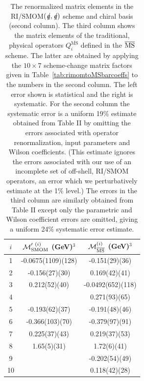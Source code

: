 \documentclass[aps,prl,
superscriptaddress,
showpacs,
preprintnumbers,
bibnotes,
amsmath,
amssymb,
twocolumn,
floatfix,
]{revtex4-1}
\def\slashed#1{\kern+0.10em /\kern-0.50em #1}
\begin{document}
\begin{table}
\begin{tabular}{c|c||c}
\hline\hline
$i$  & ${\cal M}^{\prime\ (i)}_{ {\rm SMOM}}$ (GeV)$^3$ & ${\cal M}^{(i)}_{ \overline{\rm MS} }$  (GeV)$^3$\\
\hline
1  & -0.0675(1109)(128)	&-0.151(29)(36)\\
2  & -0.156(27)(30)		& 0.169(42)(41)\\
3  & 0.212(52)(40)		&-0.0492(652)(118)\\
4  & \textemdash		& 0.271(93)(65)\\
5  & -0.193(62)(37) 		&-0.191(48)(46)\\
6  & -0.366(103)(70) 	&-0.379(97)(91)\\
7  & 0.225(37)(43)		& 0.219(37)(53)\\
8  & 1.65(5)(31) 		& 1.72(6)(41)\\
9  & \textemdash		&-0.202(54)(49) \\
10 & \textemdash		& 0.118(42)(28) \\
\end{tabular}
\caption{The renormalized matrix elements in the RI/SMOM$(\slashed q,\slashed q)$ scheme and chiral basis (second column).  The third column shows the matrix elements of the traditional, physical operators $Q_i^{\overline{\mathrm{MS}}}$ defined in the $\overline{\rm MS}$ scheme. The latter are obtained by applying the $10\times 7$ scheme-change matrix factors given in Table~\ref{tab:rimomtoMSbarcoeffs} to the numbers in the second column. The left error shown is statistical and the right is systematic.  For the second column the systematic error is a uniform 19\% estimate obtained from Table II by omitting the errors associated with operator renormalization, input parameters and Wilson coefficients.  (This estimate ignores the errors associated with our use of an incomplete set of off-shell, RI/SMOM operators, an error which we perturbatively estimate at the 1\% level.)  The errors in the third column are similarly obtained from Table II except only the parametric and Wilson coefficient errors are omitted, giving a uniform 24\% systematic error estimate. \label{tab:Mrenorm}}
\end{table}
\end{document}
